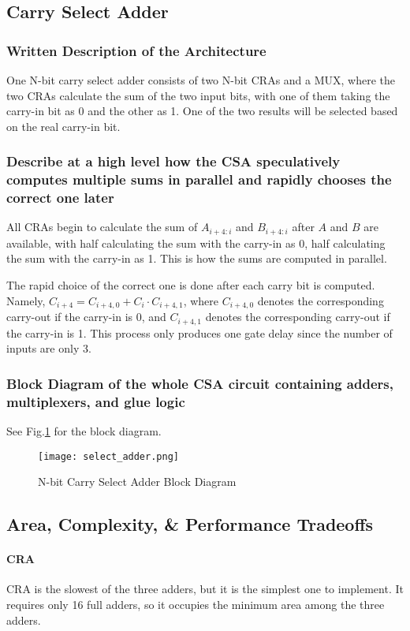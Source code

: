 \documentclass[11pt]{article}
\begin{document}
\subsection{Carry Select Adder}
\subsubsection{Written Description of the Architecture}
One N-bit carry select adder consists of two N-bit CRAs and a MUX, where the two CRAs calculate the sum of the two input bits, with one of them taking the carry-in bit as 0 and the other as 1. One of the two results will be selected based on the real carry-in bit.

\subsubsection{Describe at a high level how the CSA speculatively computes multiple sums in parallel and rapidly chooses the correct one later}
All CRAs begin to calculate the sum of $A_{i+4:i}$ and $B_{i+4:i}$ after $A$ and $B$ are available, with half calculating the sum with the carry-in as 0, half calculating the sum with the carry-in as 1. This is how the sums are computed in parallel.

The rapid choice of the correct one is done after each carry bit is computed. Namely, $C_{i+4}=C_{i+4, 0}+C_i\cdot C_{i+4, 1}$, where $C_{i+4, 0}$ denotes the corresponding carry-out if the carry-in is 0, and $C_{i+4, 1}$ denotes the corresponding carry-out if the carry-in is 1. This process only produces one gate delay since the number of inputs are only 3.

\subsubsection{Block Diagram of the whole CSA circuit containing adders, multiplexers, and glue logic}
See Fig.\ref{select} for the block diagram.
\begin{figure}[h]
    \centering
    \texttt{[image: select\_adder.png]}
    \caption{N-bit Carry Select Adder Block Diagram}
    \label{select}
\end{figure}

\subsection{Area, Complexity, \& Performance Tradeoffs}
\paragraph{CRA} CRA is the slowest of the three adders, but it is the simplest one to implement. It requires only 16 full adders, so it occupies the minimum area among the three adders.
\end{document}
